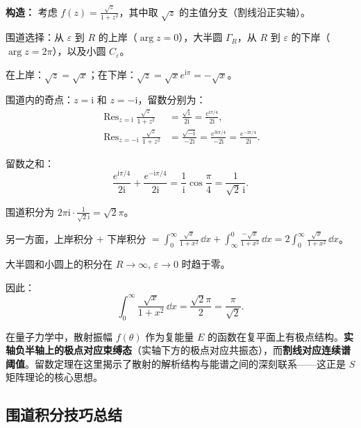 \begin{example}
\textbf{构造：} 考虑 $f(z) = \frac{\sqrt{z}}{1+z^2}$，其中取 $\sqrt{z}$ 的主值分支（割线沿正实轴）。

围道选择：从 $\varepsilon$ 到 $R$ 的上岸（$\arg z = 0$），大半圆 $\Gamma_R$，从 $R$ 到 $\varepsilon$ 的下岸（$\arg z = 2\pi$），以及小圆 $C_\varepsilon$。

在上岸：$\sqrt{z} = \sqrt{x}$；在下岸：$\sqrt{z} = \sqrt{x}e^{\mathrm{i}\pi} = -\sqrt{x}$。

围道内的奇点：$z=\mathrm{i}$ 和 $z=-\mathrm{i}$，留数分别为：
\begin{align*}
\mathop{\mathrm{Res}}_{z=\mathrm{i}} \frac{\sqrt{z}}{1+z^2} &= \frac{\sqrt{\mathrm{i}}}{2\mathrm{i}} = \frac{e^{\mathrm{i}\pi/4}}{2\mathrm{i}},\\
\mathop{\mathrm{Res}}_{z=-\mathrm{i}} \frac{\sqrt{z}}{1+z^2} &= \frac{\sqrt{-\mathrm{i}}}{-2\mathrm{i}} = \frac{e^{3\mathrm{i}\pi/4}}{-2\mathrm{i}} = \frac{e^{-\mathrm{i}\pi/4}}{2\mathrm{i}}.
\end{align*}

留数之和：
\[
\frac{e^{\mathrm{i}\pi/4}}{2\mathrm{i}} + \frac{e^{-\mathrm{i}\pi/4}}{2\mathrm{i}} = \frac{1}{\mathrm{i}}\cos\frac{\pi}{4} = \frac{1}{\sqrt{2}\,\mathrm{i}}.
\]

围道积分为 $2\pi\mathrm{i} \cdot \frac{1}{\sqrt{2}\mathrm{i}} = \sqrt{2}\pi$。

另一方面，上岸积分 $+$ 下岸积分 $= \int_0^{\infty} \frac{\sqrt{x}}{1+x^2}\,\dd x + \int_{\infty}^{0} \frac{-\sqrt{x}}{1+x^2}\,\dd x = 2\int_0^{\infty} \frac{\sqrt{x}}{1+x^2}\,\dd x$。

大半圆和小圆上的积分在 $R\to\infty$, $\varepsilon\to0$ 时趋于零。

因此：
\begin{equation}
\int_0^{\infty} \frac{\sqrt{x}}{1+x^2}\,\dd x = \frac{\sqrt{2}\pi}{2} = \frac{\pi}{\sqrt{2}}.
\end{equation}
\end{example}

\begin{insight}[量子散射理论中的留数]
在量子力学中，散射振幅 $f(\theta)$ 作为复能量 $E$ 的函数在复平面上有极点结构。\textbf{实轴负半轴上的极点对应束缚态}（实轴下方的极点对应共振态），而\textbf{割线对应连续谱阈值}。留数定理在这里揭示了散射的解析结构与能谱之间的深刻联系——这正是 $S$ 矩阵理论的核心思想。
\end{insight}

\subsection{围道积分技巧总结}

